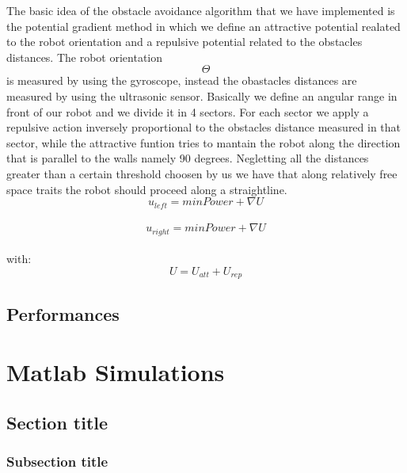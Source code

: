 \documentclass[a4paper,11pt,oneside]{book}
\begin{document}
The basic idea of the obstacle avoidance algorithm that we have implemented is the potential gradient method in which we define an attractive potential realated to the robot orientation and a repulsive potential related to the obstacles distances. The robot orientation $$\Theta$$ is measured by using the gyroscope, instead the obastacles distances are measured by using the ultrasonic sensor. Basically we define an angular range in front of our robot and we divide it in 4 sectors. For each sector we apply a repulsive action inversely proportional to the obstacles distance measured in that sector, while the attractive funtion tries to mantain the robot along the direction that is parallel to the walls namely 90 degrees. Negletting all the distances greater than a certain threshold choosen by us we have that along relatively free space traits the robot should proceed along a straightline.\\

	$$u_{left} = minPower + \nabla U$$  \\ 
    $$u_{right}= minPower + \nabla U$$  \\
    
with:\\

	$$U = U_{att} + U_{rep} $$

\section{Performances}






\chapter{Matlab Simulations}

\section{Section title}
\subsection {Subsection title}







{}

\end{document}
